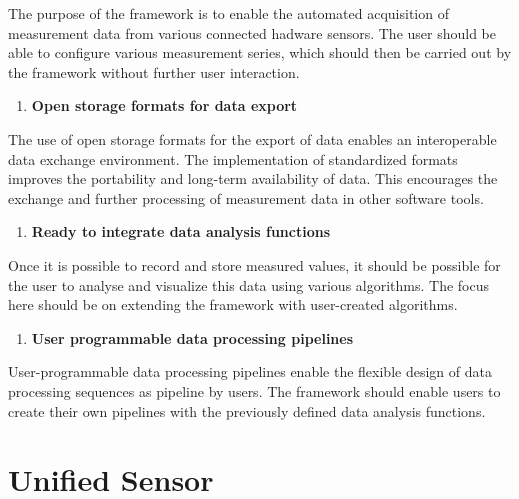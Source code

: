The purpose of the framework is to enable the automated acquisition of
measurement data from various connected hadware sensors. The user should
be able to configure various measurement series, which should then be
carried out by the framework without further user interaction.

\begin{enumerate}
\def\labelenumi{\arabic{enumi}.}
\setcounter{enumi}{2}
\tightlist
\item
  \textbf{Open storage formats for data export}
\end{enumerate}

The use of open storage formats for the export of data enables an
interoperable data exchange environment. The implementation of
standardized formats improves the portability and long-term availability
of data. This encourages the exchange and further processing of
measurement data in other software tools.

\begin{enumerate}
\def\labelenumi{\arabic{enumi}.}
\setcounter{enumi}{3}
\tightlist
\item
  \textbf{Ready to integrate data analysis functions}
\end{enumerate}

Once it is possible to record and store measured values, it should be
possible for the user to analyse and visualize this data using various
algorithms. The focus here should be on extending the framework with
user-created algorithms.

\begin{enumerate}
\def\labelenumi{\arabic{enumi}.}
\setcounter{enumi}{4}
\tightlist
\item
  \textbf{User programmable data processing pipelines}
\end{enumerate}

User-programmable data processing pipelines enable the flexible design
of data processing sequences as pipeline by users. The framework should
enable users to create their own pipelines with the previously defined
data analysis functions.

\hypertarget{unified-sensor}{%
\chapter{Unified Sensor}\label{unified-sensor}}

